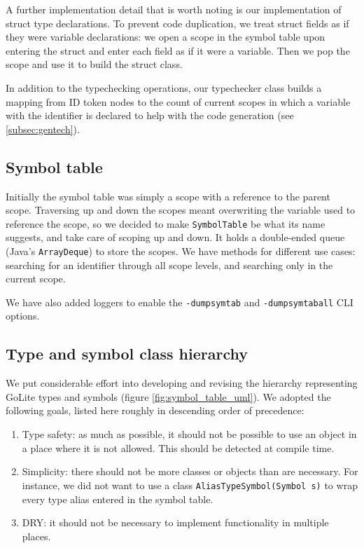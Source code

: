 \documentclass[oneside]{article}
\begin{document}
A further implementation detail that is worth noting is our implementation of struct type declarations. To prevent code duplication, we treat struct fields as if they were variable declarations: we open a scope in the symbol table upon entering the struct and enter each field as if it were a variable. Then we pop the scope and use it to build the struct class.

In addition to the typechecking operations, our typechecker class builds a mapping from ID token nodes to the count of current scopes in which a variable with the identifier is declared to help with the code generation (see \ref{subsec:gentech}).

\subsection{Symbol table}

Initially the symbol table was simply a scope with a reference to the parent scope. Traversing up and down the scopes meant overwriting the variable used to reference the scope, so we decided to make \texttt{SymbolTable} be what its name suggests, and take care of scoping up and down. It holds a double-ended queue (Java's \texttt{ArrayDeque}) to store the scopes. We have methods for different use cases: searching for an identifier through all scope levels, and searching only in the current scope.

We have also added loggers to enable the \verb|-dumpsymtab| and \verb|-dumpsymtaball| CLI options.

\subsection{Type and symbol class hierarchy}

We put considerable effort into developing and revising the hierarchy representing GoLite types and symbols (figure \ref{fig:symbol_table_uml}). We adopted the following goals, listed here roughly in descending order of precedence:

\begin{enumerate}
    \item Type safety: as much as possible, it should not be possible to use an object in a place where it is not allowed. This should be detected at compile time.
    \item Simplicity: there should not be more classes or objects than are necessary. For instance, we did not want to use a class \texttt{AliasTypeSymbol(Symbol s)} to wrap every type alias entered in the symbol table.
    \item DRY: it should not be necessary to implement functionality in multiple places.
\end{enumerate}
\end{document}
